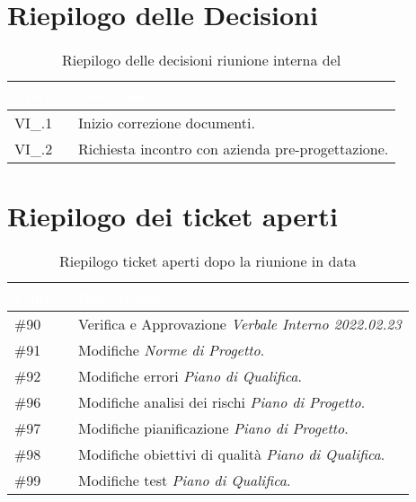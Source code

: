 \section{Riepilogo delle Decisioni}


\begin{table}[!htbp]
\renewcommand{\arraystretch}{1.5}
\begin{tabular}{m{}<{\centering}  m{}<{\centering}}
\rowcolor{darkblue} \textcolor{white}{\textbf{Codice}} & \textcolor{white}{\textbf{Decisione}} \\
\hline
VI\_{}\D{}.1 & Inizio correzione documenti.\\
VI\_{}\D{}.2 & Richiesta incontro con azienda pre-progettazione.\\
\end{tabular}
\caption{Riepilogo delle decisioni riunione interna del \D}
\end{table}

\section{Riepilogo dei ticket aperti}

\begin{table}[!htbp]
    \renewcommand{\arraystretch}{1.5}
    \begin{tabular}{m{}<{\centering}  m{}<{\centering}}
        \rowcolor{darkblue} \textcolor{white}{\textbf{Codice}} & \textcolor{white}{\textbf{Descrizione}}                        \\
        \hline
        \#{90}										  & Verifica e Approvazione \textit{Verbale Interno 2022.02.23} \\
        \#{91}                                         & Modifiche \textit{Norme di Progetto}. \\
        \#{92}                                          & Modifiche errori \textit{Piano di Qualifica}. \\
        \#{96}                                          & Modifiche analisi dei rischi \textit{Piano di Progetto}. \\
        \#{97}                                          & Modifiche pianificazione \textit{Piano di Progetto}. \\
        \#{98}                                          & Modifiche obiettivi di qualità \textit{Piano di Qualifica}. \\
        \#{99}                                          & Modifiche test \textit{Piano di Qualifica}. \\
    \end{tabular}
    \caption{Riepilogo ticket aperti dopo la riunione in data \D}
\end{table}